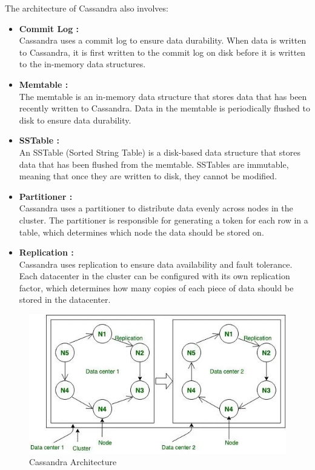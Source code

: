 \documentclass[12pt]{article}
\begin{document}
The architecture of Cassandra also involves: 
\begin{itemize}
    \item {\bfseries Commit Log : \\}
    Cassandra uses a commit log to ensure data durability. When data is written to Cassandra, it is first written to the commit log on disk before it is written to the in-memory data structures.
    \item{\bfseries Memtable : \\}
    The memtable is an in-memory data structure that stores data that has been recently written to Cassandra. Data in the memtable is periodically flushed to disk to ensure data durability.
    \item {\bfseries SSTable : \\}
    An SSTable (Sorted String Table) is a disk-based data structure that stores data that has been flushed from the memtable. SSTables are immutable, meaning that once they are written to disk, they cannot be modified.
    \item {\bfseries Partitioner : \\}
    Cassandra uses a partitioner to distribute data evenly across nodes in the cluster. The partitioner is responsible for generating a token for each row in a table, which determines which node the data should be stored on.
    \item{\bfseries Replication : \\}
    Cassandra uses replication to ensure data availability and fault tolerance. Each datacenter in the cluster can be configured with its own replication factor, which determines how many copies of each piece of data should be stored in the datacenter.
\end{itemize}
\begin{figure}[h!]
    \centering
    \includegraphics[scale = 0.7]{images/Cassandra.png}
    \caption{Cassandra Architecture}
\end{figure}
\end{document}
